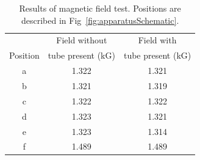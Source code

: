 \begin{table}[htb]
	\centering
	\begin{tabular}{ ccc }
		 & Field without \he  & Field with \he  	\\
		Position  &   tube present (kG)	  &  tube present (kG)      \\ \hline \hline
		a & 1.322 & 1.321 \\			
		b & 1.321 & 1.319 \\			
		c & 1.322 & 1.322 \\			
		d & 1.323 & 1.321 \\				
		e & 1.323 & 1.314 \\		
		f & 1.489 & 1.489 \\		\hline	
	\end{tabular}
	\caption[Results of magnetic field test]{Results of magnetic field test. Positions are described in Fig~\ref{fig:apparatusSchematic}.}
	\label{tab:magField}
\end{table}





